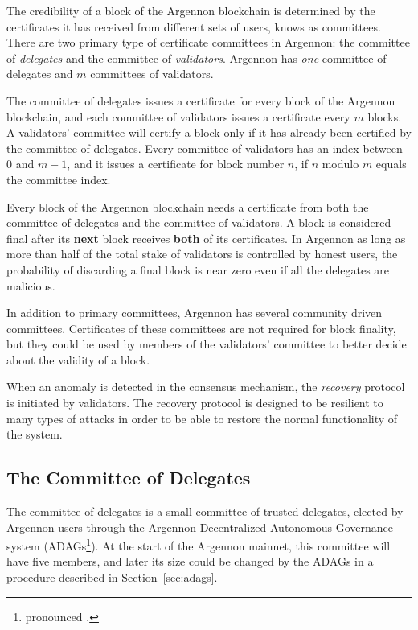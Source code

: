 
The credibility of a block of the Argennon blockchain is determined by the certificates it has received
from different sets of users, knows as committees. There are two primary type of certificate committees in
Argennon: the committee of \emph{delegates} and the committee
of \emph{validators}. Argennon has \emph{one} committee of delegates and $m$ committees of validators.

The committee of delegates issues a certificate for every block of the Argennon blockchain, and each
committee of validators issues a certificate every $m$ blocks. A validators' committee will
certify a block only if it has already been certified by the committee of delegates. Every committee of validators has
an index between $0$ and $m - 1$, and it issues a certificate for block number $n$, if $n$ modulo $m$ equals
the committee index.

Every block of the Argennon blockchain needs a certificate from both the committee of delegates and
the committee of validators. A block is considered final after its \textbf{next} block receives \textbf{both} of
its certificates. In Argennon as long as more than half of the total stake of validators is controlled by honest users,
the probability of discarding a final block is near zero even if all the delegates are malicious.

In addition to primary committees, Argennon has several community driven committees. Certificates of these
committees are not required for block finality, but they could be used by members of the
validators' committee to better decide about the validity of a block.

When an anomaly is detected in the consensus mechanism, the \emph{recovery} protocol is initiated by validators. The
recovery protocol is designed to be resilient to many types of attacks in order to be able to restore the normal
functionality of the system.

\subsection{The Committee of Delegates}\label{subsec:the-committee-of-delegates}

The committee of delegates is a small committee of trusted delegates, elected by Argennon users through the
Argennon Decentralized Autonomous Governance system (ADAGs\footnote{pronounced .}).
At the start of the Argennon mainnet, this committee will have
five members, and later its size could be changed by the ADAGs in a procedure described
in Section~\ref{sec:adags}.

